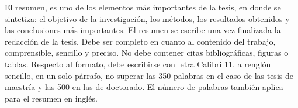 
El resumen, es uno de los elementos más importantes de la tesis, en donde se sintetiza: el objetivo de la investigación, los métodos, los resultados obtenidos y las conclusiones más importantes. El resumen se escribe una vez finalizada la redacción de la tesis. Debe ser completo en cuanto al contenido del trabajo, comprensible, sencillo y preciso. No debe contener citas bibliográficas,  figuras o tablas. Respecto al formato, debe escribirse con letra Calibri 11, a renglón sencillo, en un solo párrafo, no superar las 350 palabras en el caso de las tesis de maestría y las 500 en las de doctorado. El número de palabras también aplica para el resumen en inglés.